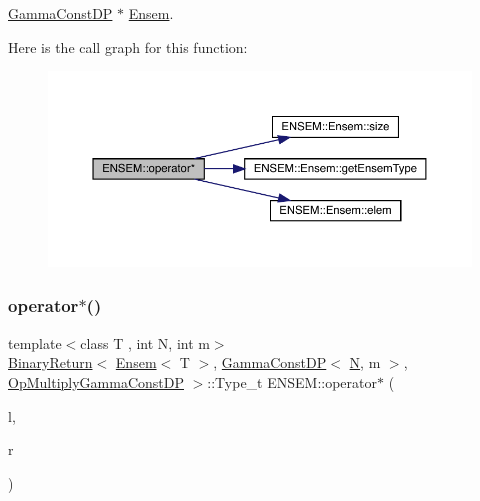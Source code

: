 \mbox{\hyperlink{classENSEM_1_1GammaConstDP}{Gamma\+Const\+DP}} $\ast$ \mbox{\hyperlink{classENSEM_1_1Ensem}{Ensem}}. 

Here is the call graph for this function\+:\nopagebreak
\begin{figure}[H]
\begin{center}
\leavevmode
\includegraphics[width=350pt]{d1/d9e/group__eensem_ga60f93a7eee86e9559faa6e162cf9b9a1_cgraph}
\end{center}
\end{figure}
\mbox{\label{group__eensem_ga0377e46872c4fb569a240b0b60ef577e}} 
\subsubsection{\texorpdfstring{operator$\ast$()}{operator*()}\hspace{0.1cm}{\footnotesize\ttfamily [9/11]}}
{\footnotesize\ttfamily template$<$class T , int N, int m$>$ \\
\mbox{\hyperlink{structENSEM_1_1BinaryReturn}{Binary\+Return}}$<$ \mbox{\hyperlink{classENSEM_1_1Ensem}{Ensem}}$<$ T $>$, \mbox{\hyperlink{classENSEM_1_1GammaConstDP}{Gamma\+Const\+DP}}$<$ \mbox{\hyperlink{adat__devel_2lib_2hadron_2operator__name__util_8cc_a7722c8ecbb62d99aee7ce68b1752f337}{N}}, m $>$, \mbox{\hyperlink{structENSEM_1_1OpMultiplyGammaConstDP}{Op\+Multiply\+Gamma\+Const\+DP}} $>$\+::Type\+\_\+t E\+N\+S\+E\+M\+::operator$\ast$ (\begin{DoxyParamCaption}\item[{const \mbox{\hyperlink{classENSEM_1_1Ensem}{Ensem}}$<$ T $>$ \&}]{l,  }\item[{const \mbox{\hyperlink{classENSEM_1_1GammaConstDP}{Gamma\+Const\+DP}}$<$ \mbox{\hyperlink{adat__devel_2lib_2hadron_2operator__name__util_8cc_a7722c8ecbb62d99aee7ce68b1752f337}{N}}, m $>$ \&}]{r }\end{DoxyParamCaption})\hspace{0.3cm}{\ttfamily [inline]}}



